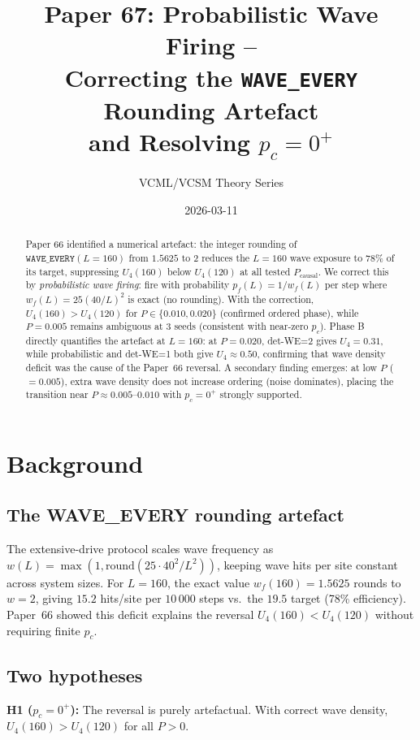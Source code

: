\documentclass[11pt,a4paper]{article}
\title{\textbf{Paper 67: Probabilistic Wave Firing --\\
Correcting the \texttt{WAVE\_EVERY} Rounding Artefact\\
and Resolving $p_c = 0^+$}}
\author{VCML/VCSM Theory Series}
\date{2026-03-11}
\begin{document}
\maketitle

\begin{abstract}
Paper 66 identified a numerical artefact: the integer rounding of
$\texttt{WAVE\_EVERY}(L=160)$ from $1.5625$ to $2$ reduces the $L=160$
wave exposure to $78\%$ of its target, suppressing $U_4(160)$ below
$U_4(120)$ at all tested $P_\text{causal}$.
We correct this by \emph{probabilistic wave firing}: fire with probability
$p_f(L)=1/w_f(L)$ per step where $w_f(L)=25(40/L)^2$ is exact (no rounding).
With the correction, $U_4(160) > U_4(120)$ for $P\in\{0.010,0.020\}$
(confirmed ordered phase), while $P=0.005$ remains ambiguous at 3 seeds
(consistent with near-zero $p_c$).
Phase B directly quantifies the artefact at $L=160$: at $P=0.020$,
det-WE=2 gives $U_4=0.31$, while probabilistic and det-WE=1 both give
$U_4\approx0.50$, confirming that wave density deficit was the cause
of the Paper~66 reversal.
A secondary finding emerges: at low $P$ ($=0.005$), extra wave density
does not increase ordering (noise dominates), placing the transition
near $P\approx 0.005$--$0.010$ with $p_c = 0^+$ strongly supported.
\end{abstract}

\section{Background}

\subsection{The WAVE\_EVERY rounding artefact}

The extensive-drive protocol scales wave frequency as
$w(L)=\max(1,\mathrm{round}(25\cdot 40^2/L^2))$,
keeping wave hits per site constant across system sizes.
For $L=160$, the exact value $w_f(160)=1.5625$ rounds to $w=2$,
giving $15.2$ hits/site per $10\,000$ steps vs.\ the $19.5$ target
(78\% efficiency).  Paper~66 showed this deficit explains the reversal
$U_4(160)<U_4(120)$ without requiring finite $p_c$.

\subsection{Two hypotheses}

\textbf{H1 ($p_c=0^+$):} The reversal is purely artefactual.
With correct wave density, $U_4(160)>U_4(120)$ for all $P>0$.
\end{document}
